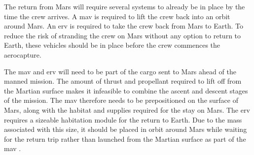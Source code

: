 The return from Mars will require several systems to already be in place by the time the crew arrives. A \gls{mav} is required to lift the crew back into an orbit around Mars. An \gls{erv} is required to take the crew back from Mars to Earth. To reduce the risk of stranding the crew on Mars without any option to return to Earth, these vehicles should be in place before the crew commences the aerocapture. 

The \gls{mav} and \gls{erv} will need to be part of the cargo sent to Mars ahead of the manned mission. The amount of thrust and propellant required to lift off from the Martian surface makes it infeasible to combine the ascent and descent stages of the mission. The \gls{mav} therefore needs to be prepositioned on the surface of Mars, along with the habitat and supplies required for the stay on Mars. The \gls{erv} requires a sizeable habitation module for the return to Earth. Due to the mass associated with this size, it should be placed in orbit around Mars while waiting for the return trip rather than launched from the Martian surface as part of the \gls{mav} \cite{Hoffman1997a}.